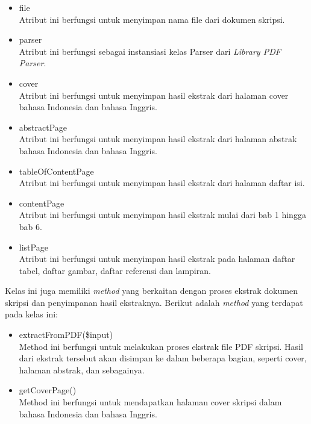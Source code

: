 \begin{enumerate}
		\begin{itemize}
			\item file \\
			Atribut ini berfungsi untuk menyimpan nama file dari dokumen skripsi.
			
			\item parser \\			
			Atribut ini berfungsi sebagai instansiasi kelas Parser dari \textit{Library PDF Parser}.
			
			\item cover \\
			Atribut ini berfungsi untuk menyimpan hasil ekstrak dari halaman cover bahasa Indonesia dan bahasa Inggris.
			
			\item abstractPage \\			
			Atribut ini berfungsi untuk menyimpan hasil ekstrak dari halaman abstrak bahasa Indonesia dan bahasa Inggris.
			
			\item tableOfContentPage \\
			Atribut ini berfungsi untuk menyimpan hasil ekstrak dari halaman daftar isi.
			
			\item contentPage \\	
			Atribut ini berfungsi untuk menyimpan hasil ekstrak mulai dari bab 1 hingga bab 6.
			
			\item listPage \\
			Atribut ini berfungsi untuk menyimpan hasil ekstrak pada halaman daftar tabel, daftar gambar, daftar referensi dan lampiran.
			
		\end{itemize}
	
	Kelas ini juga memiliki \textit{method} yang berkaitan dengan proses ekstrak dokumen skripsi dan penyimpanan hasil ekstraknya. Berikut adalah \textit{method} yang terdapat pada kelas ini:
		
		\begin{itemize}
			\item extractFromPDF(\$input) \\
			Method ini berfungsi untuk melakukan proses ekstrak file PDF skripsi. Hasil dari ekstrak tersebut akan disimpan ke dalam beberapa bagian, seperti cover, halaman abstrak, dan sebagainya. 
			
			\item getCoverPage() \\
			Method ini berfungsi untuk mendapatkan halaman cover skripsi dalam bahasa Indonesia dan bahasa Inggris.
			

\end{itemize}
\end{enumerate}
